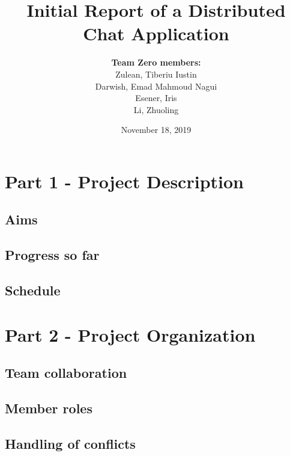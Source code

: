 \documentclass[11pt,openright,a4paper]{article}
\title{\textbf{Initial Report of a Distributed Chat Application}}
\author{\textbf{Team Zero members:} 
		\\Zulean, Tiberiu Iustin 
		\\Darwish, Emad Mahmoud Nagui 
		\\ Esener, Iris
		\\ Li, Zhuoling
}
\date{November 18, 2019}
\begin{document}


\maketitle

\setcounter{page}{1}

\section*{Part 1 - Project Description}
\addtocounter{section}{1}
\label{part1}


\subsection{Aims}
\label{aims}



\subsection{Progress so far}
\label{progress}



\subsection{Schedule}
\label{schedule}



\section*{Part 2 - Project Organization}
\addtocounter{section}{1}
\label{part2}


\subsection{Team collaboration}
\label{collaboration}



\subsection{Member roles}
\label{roles}



\subsection{Handling of conflicts}
\label{conflicts}


\end{document}

